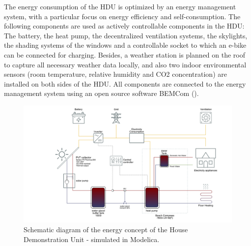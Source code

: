 \documentclass[twocolumn, a4paper,10pt]{article}
\begin{document}
The energy consumption of the HDU is optimized by an energy management system, with a particular focus on energy efficiency and self-consumption. The following components are used as actively controllable components in the HDU: The battery, the heat pump, the decentralized ventilation systems, the skylights, the shading systems of the windows and a controllable socket to which an e-bike can be connected for charging. Besides, a weather station is planned on the roof to capture all necessary weather data locally, and also two indoor environmental sensors (room temperature, relative humidity and CO2 concentration) are installed on both sides of the HDU. All components are connected to the energy management system using an open source software BEMCom (\citeyear{Woelfle2022}).

\begin{figure}[ht]
\centering
\includegraphics[trim={9cm 0 0 0},scale=0.3]{img/HDU_SimConcept.pdf}
\vspace{-5pt} 
\caption{Schematic diagram of the energy concept of the House Demonstration Unit - simulated in Modelica.}
\label{fig:HDU_SimConcept}
\end{figure}

\end{document}
